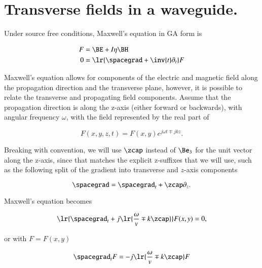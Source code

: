 %
%
\section{Transverse fields in a waveguide.}

Under source free conditions, Maxwell's equation in GA form is

\begin{equation}\label{eqn:transverseField:2}
\begin{aligned}
F &= \BE + I \eta \BH \\
0 &= \lr{ \spacegrad + \inv{t} \partial_t } F
\end{aligned}
\end{equation}

Maxwell's equation allows for components of the electric and magnetic field along the propagation direction and the transverse plane, however, it is possible to relate the transverse and propagating field components.  Assume that the propagation direction is along the z-axis (either forward or backwards), with angular frequency \( \omega \), with the field represented by the real part of

\begin{dmath}\label{eqn:transverseField:28}
F(x, y, z, t) = F(x, y) e^{j \omega t \mp j k z}.
\end{dmath}

Breaking with convention, we will use \( \zcap \) instead of \( \Be_3 \) for the unit vector along the z-axis, since that matches the explicit z-suffixes that we will use, such as the following split of the
gradient into transverse and \(z\)-axis components

\begin{dmath}\label{eqn:transverseField:88}
\spacegrad = \spacegrad_t + \zcap \partial_z.
\end{dmath}

Maxwell's equation becomes

\begin{equation}\label{eqn:transverseField:summaryMax2}
\lr{\spacegrad_t + j \lr{ \frac{\omega}{v} \mp k \zcap } } F(x,y) = 0,
\end{equation}

or with \( F = F(x, y) \)

\begin{dmath}\label{eqn:transverseField:148}
\spacegrad_t F = - j \lr{ \frac{\omega}{v} \mp k \zcap } F
\end{dmath}

